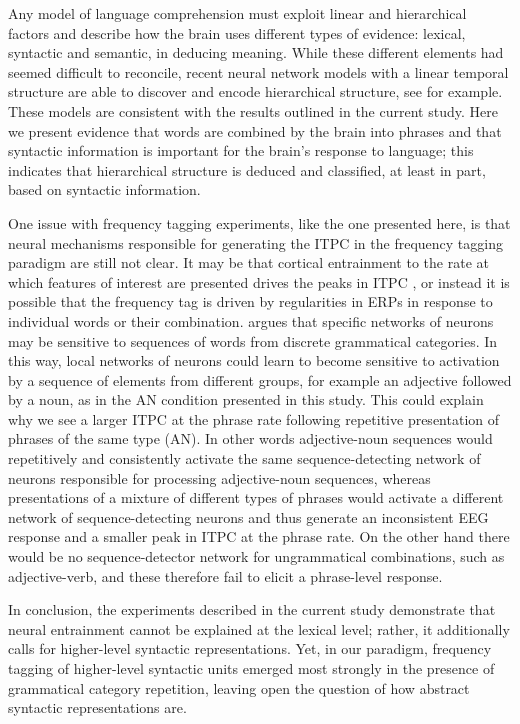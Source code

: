 \documentclass[10pt,letterpaper]{article}
\newcommand{\citet}[1]{\cite{#1}}
\begin{document}
Any model of language comprehension must exploit linear and
hierarchical factors and describe how the brain uses different types
of evidence: lexical, syntactic and semantic, in deducing
meaning. While these different elements had seemed difficult to
reconcile, recent neural network models with a linear temporal
structure are able to discover and encode hierarchical structure, see
\citet{LakretzEtAl2019,Baroni2019} for example. These models are
consistent with the results outlined in the current study. Here we
present evidence that words are combined by the brain into phrases and
that syntactic information is important for the brain's response to
language; this indicates that hierarchical structure is deduced and
classified, at least in part, based on syntactic information.


One issue with frequency tagging experiments, like the one presented
here, is that neural mechanisms responsible for generating the ITPC in
the frequency tagging paradigm are still not clear. It may be that
cortical entrainment to the rate at which features of interest are
presented drives the peaks in ITPC \cite{Meyer2018}, or instead it is
possible that the frequency tag is driven by regularities in ERPs in
response to individual words or their
combination. \citet{PulvermullerEtAl2002} argues that specific
networks of neurons may be sensitive to sequences of words from
discrete grammatical categories. In this way, local networks of
neurons could learn to become sensitive to activation by a sequence of
elements from different groups, for example an adjective followed by a
noun, as in the AN condition presented in this study. This could
explain why we see a larger ITPC at the phrase rate following
repetitive presentation of phrases of the same type (AN). In other
words adjective-noun sequences would repetitively and consistently
activate the same sequence-detecting network of neurons responsible
for processing adjective-noun sequences, whereas presentations of a
mixture of different types of phrases would activate a different
network of sequence-detecting neurons and thus generate an
inconsistent EEG response and a smaller peak in ITPC at the phrase
rate. On the other hand there would be no sequence-detector network
for ungrammatical combinations, such as adjective-verb, and these
therefore fail to elicit a phrase-level response.

In conclusion, the experiments described in the current study
demonstrate that neural entrainment cannot be explained at the lexical
level; rather, it additionally calls for higher-level syntactic
representations. Yet, in our paradigm, frequency tagging of
higher-level syntactic units emerged most strongly in the presence of
grammatical category repetition, leaving open the question of how abstract
syntactic representations are.
\end{document}
